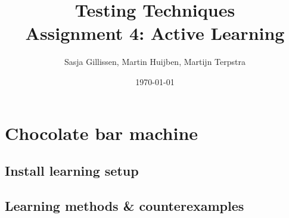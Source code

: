 \documentclass[11pt,a4paper]{article}
\author{Sasja Gillissen, Martin Huijben, Martijn Terpstra}
\date{\today}
\title{Testing Techniques\\
  \textbf{Assignment 4: Active Learning}}
\begin{document}
\maketitle

\section{Chocolate bar machine}
\subsection{Install learning setup}
\subsection{Learning methods & counterexamples}







\end{document}
